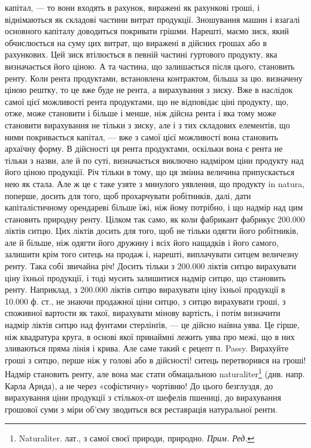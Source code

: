 \parcont{}  %
капітал, — то вони входять в рахунок, виражені як рахункові гроші, і віднімаються
як складові частини витрат продукції. Зношування машин і взагалі
основного капіталу доводиться покривати грішми. Нарешті, маємо зиск, який
обчислюється на суму цих витрат, що виражені в дійсних грошах або в рахункових.
Цей зиск втілюється в певній частині гуртового продукту, яка визначається
його ціною. А та частина, що залишається після цього, становить ренту.
Коли рента продуктами, встановлена контрактом, більша за цю. визначену ціною
рештку, то це вже буде не рента, а вирахування з зиску. Вже в наслідок самої
цієї можливості рента продуктами, що не відповідає ціні продукту, що, отже,
може становити і більше і менше, ніж дійсна рента і яка тому може становити
вирахування не тільки з зиску, але і з тих складових елементів, що ними покривається
капітал, — вже з самої цієї можливості вона становить архаїчну
форму. В дійсності ця рента продуктами, оскільки вона є рента не тільки з
назви, але й по суті, визначається виключно надміром ціни продукту над його
ціною продукції. Річ тільки в тому, що ця змінна величина припускається нею
як стала. Але ж це є таке узяте з минулого уявлення, що продукту in natura,
поперше, досить для того, щоб прохарчувати робітників, далі, дати капіталістичному
орендареві більше їжі, ніж йому потрібно, і що надмір над цим становить
природну ренту. Цілком так само, як коли фабрикант фабрикує 200.000
ліктів ситцю. Цих ліктів досить для того, щоб не тільки одягти його робітників,
але й більше, ніж одягти його дружину і всіх його нащадків і його самого, залишити
крім того ситець на продаж і, нарешті, виплачувати ситцем величезну
ренту. Така собі звичайна річ! Досить тільки з 200.000 ліктів ситцю вирахувати
ціну їхньої продукції, і тоді мусить залишитися надмір ситцю, що становить
ренту. Наприклад, з 200.000 ліктів ситцю вирахувати ціну їхньої продукції
в 10.000 ф. ст., не знаючи продажної ціни ситцю, з ситцю вирахувати
гроші, з споживної вартости як такої, вирахувати мінову вартість, і потім визначити
надмір ліктів ситцю над фунтами стерлінґів, — це дійсно наївна уява.
Це гірше, ніж квадратура круга, в основі якої принаймні лежить уява про
межі, що в них зливаються пряма лінія і крива. Але саме такий є рецепт п.
Passy. Вирахуйте гроші з ситцю, перше ніж у голові або в дійсності! ситець
перетворився на гроші! Надмір становить ренту, але вона має стати обмацальною
naturaliter\footnote*{
Naturaliter. лат., з самої своєї природи, природно. \emph{Прим. Ред.}
} (див. напр. Карла Арнда), а не через «софістичну» чортівню!
До цього безглуздя, до вирахування ціни продукції з стількох-от шефелів пшениці,
до вирахування грошової суми з міри об’єму зводиться вся реставрація
натуральної ренти.

